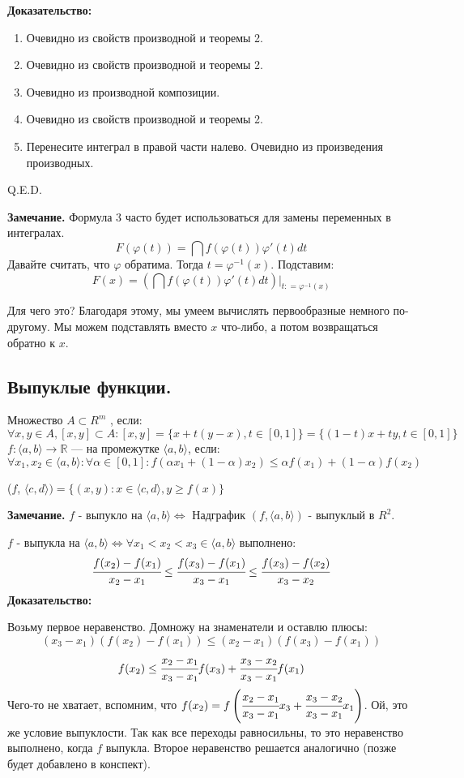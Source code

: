 \textbf{Доказательство:}
\begin{enumerate}
    \item Очевидно из свойств производной и теоремы 2.
    \item Очевидно из свойств производной и теоремы 2.
    \item Очевидно из производной композиции.
    \item Очевидно из свойств производной и теоремы 2.
    \item Перенесите интеграл в правой части налево. Очевидно из произведения производных.
\end{enumerate}
    \hfill Q.E.D.

\textbf{Замечание.} Формула 3 часто будет использоваться для замены переменных в интегралах.
$$F(\varphi(t)) = \dint f(\varphi(t))\varphi'(t)dt $$
Давайте считать, что $\varphi $ обратима. Тогда $t = \varphi^{-1}(x)$. Подставим:
$$F(x)=\left(\dint f(\varphi(t))\varphi'(t)dt\right)\Big|_{t: = \varphi^{-1}(x)} $$

Для чего это? Благодаря этому, мы умеем вычислять первообразные немного по-другому. Мы можем подставлять вместо $x$ что-либо, а потом возвращаться обратно к $x$.

\subsection{Выпуклые функции.}

Множество $A \subset R^m$ , если:
$$\forall x,y \in A , [x,y]\subset A: [x,y] = \{x+t(y-x), t\in[0,1]\} = \{(1-t)x + ty, t\in[0,1]\}$$
 $f:\langle a,b\rangle\rightarrow \mathbb{R}$ ---  на промежутке $\langle a,b\rangle$, если:
$$\forall x_1,x_2 \in \langle a,b \rangle: \forall \alpha \in[0,1]:f(\alpha x_1+(1-\alpha)x_2)\leq \alpha f(x_1) + (1-\alpha) f(x_2)$$

 ($f$, $\langle c,d \rangle) = \{(x,y): x\in \langle c,d \rangle, y \geq f(x)  \}$

\textbf{Замечание.} $f$ - выпукло на $\langle a,b\rangle \Leftrightarrow$ Надграфик $(f, \langle a,b \rangle)$ - выпуклый в $R^2$.


$f$ - выпукла на $\langle a,b\rangle \Leftrightarrow \forall x_1<x_2<x_3 \in\langle a,b \rangle$ выполнено:
$$\cfrac{f(x_2)-f(x_1)}{x_2-x_1} \leq \cfrac{f(x_3)-f(x_1)}{x_3-x_1}\leq \cfrac{f(x_3)-f(x_2)}{x_3-x_2}$$
\textbf{Доказательство:}

Возьму первое неравенство. Домножу на знаменатели и оставлю плюсы:
$$(x_3-x_1) (f(x_2)-f(x_1)) \leq (x_2-x_1) (f(x_3)-f(x_1))$$
$$f(x_2)\leq \cfrac{x_2-x_1}{x_3-x_1}f(x_3) + \cfrac{x_3-x_2}{x_3-x_1}f(x_1)$$
Чего-то не хватает, вспомним, что $f(x_2) = f\left (\cfrac{x_2-x_1}{x_3-x_1}x_3 +\cfrac{x_3-x_2}{x_3-x_1}x_1\right)$. Ой, это же условие выпуклости. Так как все переходы равносильны, то 
это неравенство выполнено, когда $f$ выпукла. Второе неравенство решается аналогично (позже будет добавлено в конспект).

